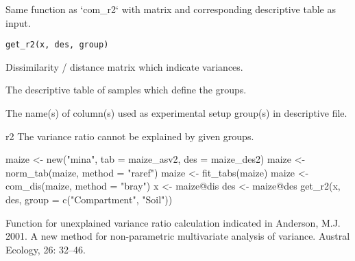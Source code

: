 \documentclass[a4paper]{book}
\begin{document}
%
\begin{Description}\relax
Same function as `com\_r2` with matrix and corresponding descriptive table as
input.
\end{Description}
%
\begin{Usage}
\begin{verbatim}
get_r2(x, des, group)
\end{verbatim}
\end{Usage}
%
\begin{Arguments}
\begin{ldescription}
\item[\code{x}] Dissimilarity / distance matrix which indicate variances.

\item[\code{des}] The descriptive table of samples which define the groups.

\item[\code{group}] The name(s) of column(s) used  as experimental setup group(s) in
descriptive file.
\end{ldescription}
\end{Arguments}
%
\begin{Value}
r2 The variance ratio cannot be explained by given groups.
\end{Value}
%
\begin{Examples}
\begin{ExampleCode}
maize <- new("mina", tab = maize_asv2, des = maize_des2)
maize <- norm_tab(maize, method = "raref")
maize <- fit_tabs(maize)
maize <- com_dis(maize, method = "bray")
x <- maize@dis
des <- maize@des
get_r2(x, des, group = c("Compartment", "Soil"))
\end{ExampleCode}
\end{Examples}
%
\begin{Description}\relax
Function for unexplained variance ratio calculation indicated in
Anderson, M.J. 2001. A new method for non-parametric multivariate analysis of
variance. Austral Ecology, 26: 32--46.
\end{Description}
\end{document}
